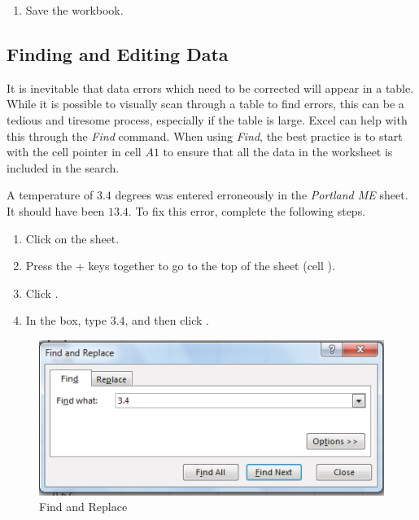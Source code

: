 \begin{enumerate}[resume]
	\item Save the  workbook.
\end{enumerate}

\subsection{Finding and Editing Data}

It is inevitable that data errors which need to be corrected will appear in a table. While it is possible to visually scan through a table to find errors, this can be a tedious and tiresome process, especially if the table is large. Excel can help with this through the \textit{Find} command. When using \textit{Find}, the best practice is to start with the cell pointer in cell $ A1 $ to ensure that all the data in the worksheet is included in the search.

A temperature of $ 3.4 $ degrees was entered erroneously in the \textit{Portland ME} sheet. It should have been $ 13.4 $. To fix this error, complete the following steps.

\begin{enumerate}
	\item Click on the  sheet.
	\item Press the + keys together to go to the top of the sheet (cell ).
	\item Click .
	\item In the  box, type $ 3.4 $, and then click .
\end{enumerate}

\begin{figure}[H]
	\centering
	\includegraphics[width=\maxwidth{.95\linewidth}]{gfx/ch05_fig06}
	\caption{Find and Replace}
	\label{05:fig06}
\end{figure}

